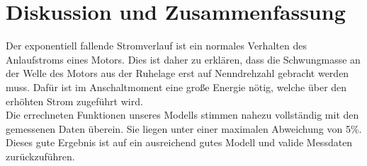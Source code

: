 \section{Diskussion und Zusammenfassung}

Der exponentiell fallende Stromverlauf ist ein normales Verhalten des Anlaufstroms eines
Motors. Dies ist daher zu erklären, dass die Schwungmasse an der Welle des Motors aus
der Ruhelage erst auf Nenndrehzahl gebracht werden muss. Dafür ist im Anschaltmoment
eine große Energie nötig, welche über den erhöhten Strom zugeführt wird.\\

Die errechneten Funktionen unseres Modells stimmen nahezu vollständig mit den gemessenen
Daten überein. Sie liegen unter einer maximalen Abweichung von 5\%. Dieses gute Ergebnis
ist auf ein ausreichend gutes Modell und valide Messdaten zurückzuführen.\\